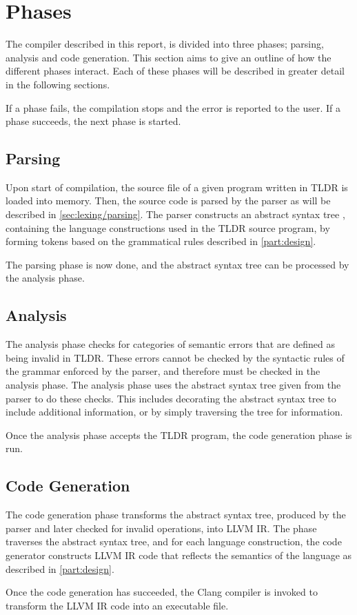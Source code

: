 \section{Phases}

The compiler described in this report, is divided into three phases; parsing, analysis and code generation. This section aims to give an outline of how the different phases interact. Each of these phases will be described in greater detail in the following sections.

If a phase fails, the compilation stops and the error is reported to the user. If a phase succeeds, the next phase is started.

\subsection{Parsing}

Upon start of compilation, the source file of a given program written in TLDR is loaded into memory. Then, the source code is parsed by the parser as will be described in \cref{sec:lexing/parsing}. The parser constructs an abstract syntax tree \cite{fisher}, containing the language constructions used in the TLDR source program, by forming tokens based on the grammatical rules described in \cref{part:design}.

The parsing phase is now done, and the abstract syntax tree can be processed by the analysis phase.

\subsection{Analysis}

The analysis phase checks for categories of semantic errors that are defined as being invalid in TLDR. These errors cannot be checked by the syntactic rules of the grammar enforced by the parser, and therefore must be checked in the analysis phase. The analysis phase uses the abstract syntax tree given from the parser to do these checks. This includes decorating the abstract syntax tree to include additional information, or by simply traversing the tree for information.

Once the analysis phase accepts the TLDR program, the code generation phase is run.

\subsection{Code Generation}

The code generation phase transforms the abstract syntax tree, produced by the parser and later checked for invalid operations, into LLVM IR. The phase traverses the abstract syntax tree, and for each language construction, the code generator constructs LLVM IR code that reflects the semantics of the language as described in \cref{part:design}.

Once the code generation has succeeded, the Clang compiler is invoked to transform the LLVM IR code into an executable file.
